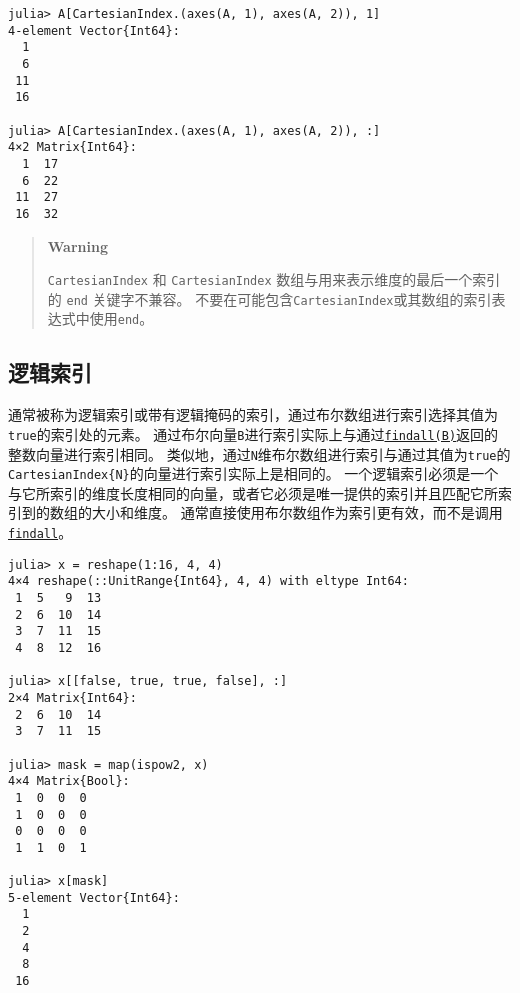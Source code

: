 \begin{verbatim}
julia> A[CartesianIndex.(axes(A, 1), axes(A, 2)), 1]
4-element Vector{Int64}:
  1
  6
 11
 16

julia> A[CartesianIndex.(axes(A, 1), axes(A, 2)), :]
4×2 Matrix{Int64}:
  1  17
  6  22
 11  27
 16  32
\end{verbatim}



\begin{quote}
\textbf{Warning}

\texttt{CartesianIndex} 和 \texttt{CartesianIndex} 数组与用来表示维度的最后一个索引的 \texttt{end} 关键字不兼容。 不要在可能包含\texttt{CartesianIndex}或其数组的索引表达式中使用\texttt{end}。

\end{quote}


\hypertarget{16147573404656390381}{}


\subsection{逻辑索引}



通常被称为逻辑索引或带有逻辑掩码的索引，通过布尔数组进行索引选择其值为\texttt{true}的索引处的元素。 通过布尔向量\texttt{B}进行索引实际上与通过\hyperlink{16067208921941164599}{\texttt{findall(B)}}返回的整数向量进行索引相同。 类似地，通过\texttt{N}维布尔数组进行索引与通过其值为\texttt{true}的\texttt{CartesianIndex\{N\}}的向量进行索引实际上是相同的。 一个逻辑索引必须是一个与它所索引的维度长度相同的向量，或者它必须是唯一提供的索引并且匹配它所索引到的数组的大小和维度。 通常直接使用布尔数组作为索引更有效，而不是调用 \hyperlink{16067208921941164599}{\texttt{findall}}。




\begin{verbatim}
julia> x = reshape(1:16, 4, 4)
4×4 reshape(::UnitRange{Int64}, 4, 4) with eltype Int64:
 1  5   9  13
 2  6  10  14
 3  7  11  15
 4  8  12  16

julia> x[[false, true, true, false], :]
2×4 Matrix{Int64}:
 2  6  10  14
 3  7  11  15

julia> mask = map(ispow2, x)
4×4 Matrix{Bool}:
 1  0  0  0
 1  0  0  0
 0  0  0  0
 1  1  0  1

julia> x[mask]
5-element Vector{Int64}:
  1
  2
  4
  8
 16
\end{verbatim}



\hypertarget{17064129854874388099}{}


